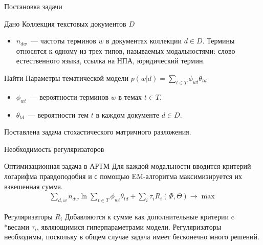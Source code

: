 \documentclass{beamer}
\begin{document}
\begin{frame}{Постановка задачи}
\begin{block}{Дано}
	Коллекция текстовых документов $D$
    \begin{itemize}
        \item $n_{dw}$~--- частоты терминов $w$ в документах коллекции $d \in D$.
Термины относятся к одному из трех типов, называемых модальностями: слово естественного языка, ссылка на НПА, юридический термин.
    \end{itemize} 
    \end{block}
\begin{block}{Найти}
	Параметры тематической модели $p(w|d)=\sum\limits_{t \in T} {\phi_{wt}\theta_{td}}$
    \begin{itemize}
        \item $\phi_{wt}$~--- вероятности терминов $w$ в темах $t \in T$.
        \item $\theta_{td}$~--- вероятности тем $t$ в каждом документе $d \in D$.
    \end{itemize} 
Поставлена задача стохастического матричного разложения.
    \end{block}
\end{frame}
\begin{frame}{Необходимость регуляризаторов}
\begin{block}{Оптимизационная задача в АРТМ}
	Для каждой модальности вводится критерий логарифма правдоподобия и с помощью EM-алгоритма максимизируется их взвешенная сумма.
\begin{align*}
	\sum\limits_{d,w} {n_{dw}\ln \sum\limits_{t \in T}} {\phi_{wt}\theta_{td}}+\sum\limits_{i}\tau_{i}R_{i}(\Phi,\Theta)\to \max
\end{align*} 
    \end{block}
\begin{block}{Регуляризаторы $R_{i}$}
	Добавляются к сумме как дополнительные критерии c \\*весами $\tau_{i}$, являющимися гиперпараметрами модели. Регуляризаторы необходимы, поскольку в общем случае задача имеет бесконечно много решений.
    \end{block}
\end{frame}
\end{document}
